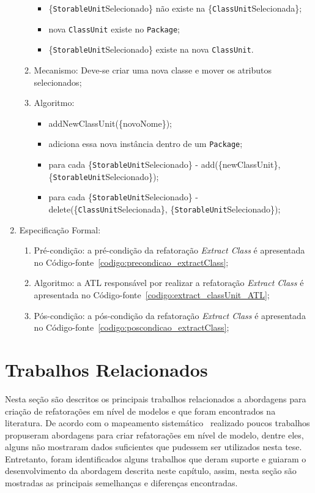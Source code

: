 \begin{enumerate}
\begin{enumerate}
\begin{itemize}
			        \item \{\texttt{StorableUnit}Selecionado\} não existe na \{\texttt{ClassUnit}Selecionada\};
			        \item nova \texttt{ClassUnit} existe no \texttt{Package};
			        \item \{\texttt{StorableUnit}Selecionado\} existe na nova \texttt{ClassUnit}.
			    \end{itemize}
			\item Mecanismo: Deve-se criar uma nova classe e mover os atributos selecionados;
			\item Algoritmo: 
			    \begin{itemize}
			        \item addNewClassUnit(\{novoNome\});
			        \item adiciona essa nova instância dentro de um \texttt{Package};
			        \item para cada \{\texttt{StorableUnit}Selecionado\} - add(\{newClassUnit\}, \{\texttt{StorableUnit}\-Selecionado\});
			        \item para cada \{\texttt{StorableUnit}Selecionado\} - delete(\{\texttt{ClassUnit}Selecionada\}, \{\texttt{Storable\-Unit}Selecionado\});
			    \end{itemize} 
	    \end{enumerate}
		\item Especificação Formal:
		\begin{enumerate}
			\item Pré-condição: a pré-condição da refatoração \textit{Extract Class} é apresentada no Código-fonte~\ref{codigo:precondicao_extractClass};
			\item Algoritmo: a ATL responsável por realizar a refatoração \textit{Extract Class} é apresentada no Código-fonte~\ref{codigo:extract_classUnit_ATL};
			\item Pós-condição: a pós-condição da refatoração \textit{Extract Class} é apresentada no Código-fonte~\ref{codigo:poscondicao_extractClass};
		\end{enumerate}
\end{enumerate}


\section{Trabalhos Relacionados}

Nesta seção são descritos os principais trabalhos relacionados a abordagens para criação de refatorações em nível de modelos e que foram encontrados na literatura. De acordo com o mapeamento sistemático~\cite{durelli_systematic_mapping} realizado poucos trabalhos propuseram abordagens para criar refatorações em nível de modelo, dentre eles, alguns não mostraram dados suficientes que pudessem ser utilizados nesta tese. Entretanto, foram identificados alguns trabalhos que deram suporte e guiaram o desenvolvimento da abordagem descrita neste capítulo, assim, nesta seção são mostradas as principais semelhanças e diferenças encontradas.


